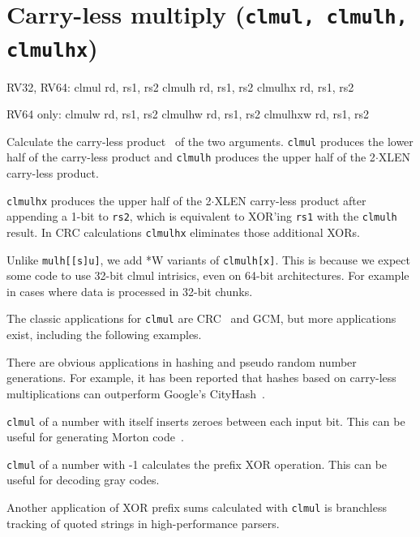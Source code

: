 
\section{Carry-less multiply (\texttt{clmul, clmulh, clmulhx})}

\begin{rvb}
  RV32, RV64:
    clmul   rd, rs1, rs2
    clmulh  rd, rs1, rs2
    clmulhx rd, rs1, rs2

  RV64 only:
    clmulw   rd, rs1, rs2
    clmulhw  rd, rs1, rs2
    clmulhxw rd, rs1, rs2
\end{rvb}

Calculate the carry-less product~\cite{CarryLessProduct} of the two arguments. \texttt{clmul}
produces the lower half of the carry-less product and \texttt{clmulh} produces the upper half
of the 2$\cdot$XLEN carry-less product.

\texttt{clmulhx} produces the upper half of the 2$\cdot$XLEN carry-less product after appending
a 1-bit to {\tt rs2}, which is equivalent to XOR'ing {\tt rs1} with the {\tt clmulh} result.
In CRC calculations {\tt clmulhx} eliminates those additional XORs.

Unlike {\tt mulh[[s]u]}, we add *W variants of {\tt clmulh[x]}. This is because we expect
some code to use 32-bit clmul intrisics, even on 64-bit architectures. For example in cases
where data is processed in 32-bit chunks.



The classic applications for \texttt{clmul} are CRC~\cite{FastCRC,Wolf18A} and GCM, but more
applications exist, including the following examples.

There are obvious applications in hashing and pseudo random number generations. For
example, it has been reported that hashes based on carry-less multiplications can
outperform Google's CityHash~\cite{CLHASH}.

\texttt{clmul} of a number with itself inserts zeroes between each input bit. This can
be useful for generating Morton code~\cite{MortonCode}.

\texttt{clmul} of a number with -1 calculates the prefix XOR operation. This can
be useful for decoding gray codes.

Another application of XOR prefix sums calculated with \texttt{clmul} is
branchless tracking of quoted strings in high-performance parsers.~\cite{ParseJSON}

